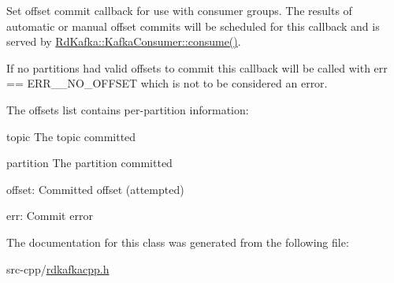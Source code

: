 Set offset commit callback for use with consumer groups. The results of automatic or manual offset commits will be scheduled for this callback and is served by \hyperlink{classRdKafka_1_1KafkaConsumer_a7dc106f1c3b99767a0930a9cf8cabf84}{RdKafka::KafkaConsumer::consume()}.

If no partitions had valid offsets to commit this callback will be called with {\ttfamily err} == ERR\_\-\_\-NO\_\-OFFSET which is not to be considered an error.

The {\ttfamily offsets} list contains per-\/partition information:
\begin{DoxyItemize}
\item {\ttfamily topic} The topic committed
\item {\ttfamily partition} The partition committed
\item {\ttfamily offset:} Committed offset (attempted)
\item {\ttfamily err:} Commit error 
\end{DoxyItemize}

The documentation for this class was generated from the following file:\begin{DoxyCompactItemize}
\item 
src-\/cpp/\hyperlink{rdkafkacpp_8h}{rdkafkacpp.h}\end{DoxyCompactItemize}
